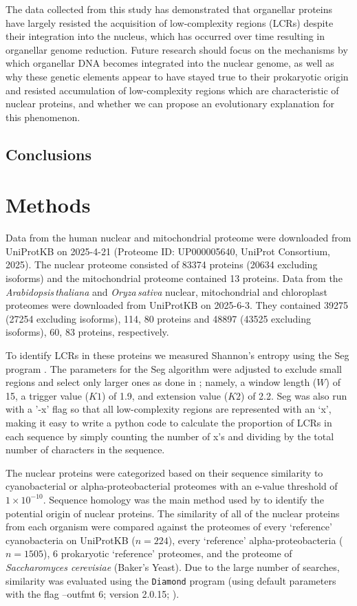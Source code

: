 \documentclass[a4paper,12pt]{article}
\newcommand{\arab}{\mbox{\textit{Arabidopsis\,thaliana}}\xspace}
\newcommand{\oryz}{\mbox{\textit{Oryza\,sativa}}\xspace}
\renewcommand{\diamond}{\mbox{\texttt{Diamond}}\xspace}
\begin{document}
\begin{multicols}{2}
The data collected from this study has demonstrated that organellar
proteins have largely resisted the acquisition of low-complexity regions
(LCRs) despite their integration into the nucleus, which has occurred over
time resulting in organellar genome reduction. Future research should
focus on the mechanisms by which organellar DNA becomes integrated into
the nuclear genome, as well as why these genetic elements appear to have
stayed true to their prokaryotic origin and resisted accumulation of
low-complexity regions which are characteristic of nuclear proteins, and
whether we can propose an evolutionary explanation for this phenomenon.


\subsection*{Conclusions}

\section*{Methods}

Data from the human nuclear and mitochondrial proteome were downloaded
from UniProtKB on 2025-4-21 (Proteome ID: UP000005640, UniProt
Consortium, 2025).  The nuclear proteome consisted of 83374 proteins
(20634 excluding isoforms) and the mitochondrial proteome contained
13 proteins. Data from the \arab and \oryz nuclear, mitochondrial
and chloroplast proteomes were downloaded from UniProtKB on 2025-6-3.
They contained 39275 (27254 excluding isoforms), 114, 80 proteins and
48897 (43525 excluding isoforms), 60, 83 proteins, respectively.

To identify LCRs in these proteins we measured Shannon's entropy using the
Seg program \citep{WootonFederhen1993}. The parameters
for the Seg algorithm were adjusted to exclude small regions and select
only larger ones as done in \citet{EnrightEtAl2023}; namely, a window length
($W$) of 15, a trigger value ($K1$) of 1.9, and extension value ($K2$) of
2.2. Seg was also run with a '-x' flag so that all low-complexity regions
are represented with an `x', making it easy to write a python code to
calculate the proportion of LCRs in each sequence by simply counting
the number of x's and dividing by the total number of characters in
the sequence.

The nuclear proteins were categorized based on their sequence similarity
to cyanobacterial or alpha-proteobacterial proteomes with an e-value
threshold of $1 \times 10^{-10}$. Sequence homology was the main method
used by \citet{MartinEtAl2002} to identify the potential origin of
nuclear proteins.  The similarity of all of the nuclear proteins from
each organism were compared against the proteomes of every `reference'
cyanobacteria on UniProtKB ($n=224$), every `reference' alpha-proteobacteria
($n=1505$), 6 prokaryotic `reference' proteomes, and the proteome of
\textit{Saccharomyces cerevisiae} (Baker's Yeast).  Due to the large
number of searches, similarity was evaluated using the \diamond program
(using default parameters with the flag --outfmt 6; version 2.0.15;
\cite{BuchfinkEtAl2015}).


\end{multicols}
\end{document}
